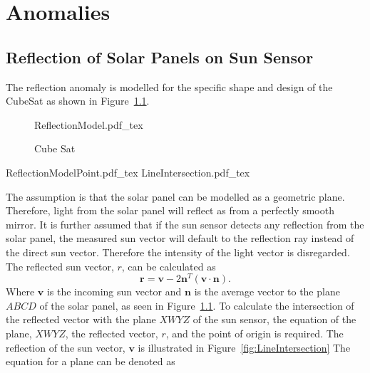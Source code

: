 \chapter{Anomalies}
\label{chap:Anomalies}

\section{Reflection of Solar Panels on Sun Sensor}
\label{section:Reflection}
The reflection anomaly is modelled for the specific shape and design of the CubeSat as shown in Figure~\ref{fig:CubeSat}.

\begin{figure}[!htb]
	\centering
	\def\svgwidth{7cm}
	{ReflectionModel.pdf_tex}
	\caption{Cube Sat}
	\label{fig:CubeSat}
\end{figure}

\begin{figure*}[!hbt]
	\centering
	\def\svgwidth{7cm}
	{ReflectionModelPoint.pdf_tex}
	\centering
	\def\svgwidth{7cm}
	{LineIntersection.pdf_tex}
	\caption{Reflection}
	\label{fig:LineIntersection}
\end{figure*}

The assumption is that the solar panel can be modelled as a geometric plane. Therefore, light from the solar panel will reflect as from a perfectly smooth mirror. It is further assumed that if the sun sensor detects any reflection from the solar panel, the measured sun vector will default to the reflection ray instead of the direct sun vector. Therefore the intensity of the light vector is disregarded. The reflected sun vector, $r$, can be calculated as
\begin{equation}
	\mathbf{r} = \mathbf{v} - 2\mathbf{n}^T(\mathbf{v} \cdot \mathbf{n}).
\end{equation}
Where $\mathbf{v}$ is the incoming sun vector and $\mathbf{n}$ is the average vector to the plane $ABCD$ of the solar panel, as seen in Figure~\ref{fig:CubeSat}. To calculate the intersection of the reflected vector with the plane $XWYZ$ of the sun sensor, the equation of the plane, $XWYZ$, the reflected vector, $r$, and the point of origin is required. The reflection of the sun vector, $\mathbf{v}$ is illustrated in Figure~\ref{fig:LineIntersection} The equation for a plane can be denoted as

